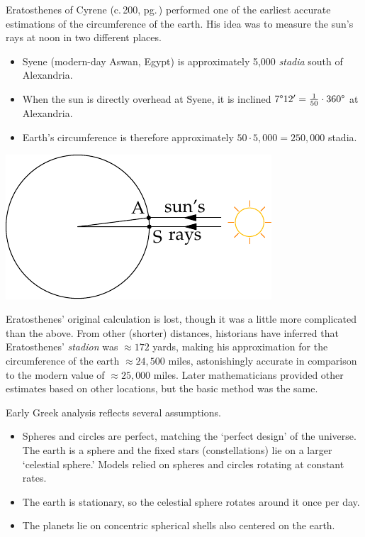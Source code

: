 Eratosthenes of Cyrene (c.\,200\BC, pg.\,\pageref{pg:eratosthenes}) performed one of the earliest accurate estimations of the circumference of the earth. His idea was to measure the sun's rays at noon in two different places.\par
\begin{minipage}[t]{0.6\linewidth}\vspace{-5pt}
	\begin{itemize}\itemsep0pt
	  \item Syene (modern-day Aswan, Egypt) is approximately 5,000 \emph{stadia} south of Alexandria.
		\item When the sun is directly overhead at Syene, it is inclined $\ang 712'=\frac 1{50}\cdot \ang{360}$ at Alexandria.
		\item Earth's circumference is therefore approximately $50\cdot 5,000=250,000$ stadia.
	\end{itemize}
\end{minipage}
\hfill
\begin{minipage}[t]{0.39\linewidth}\vspace{-5pt}
	\flushright\includegraphics[scale=0.95]{geo-18-circearth}
\end{minipage}
\bigbreak

Eratosthenes' original calculation is lost, though it was a little more complicated than the above. From other (shorter) distances, historians have inferred that Eratosthenes' \emph{stadion} was $\approx 172$ yards, making his approximation for the circumference of the earth $\approx 24,500$ miles, astonishingly accurate in comparison to the modern value of $\approx 25,000$ miles. Later mathematicians provided other estimates based on other locations, but the basic method was the same.



Early Greek analysis reflects several assumptions.
\begin{itemize}
  \item Spheres and circles are perfect, matching the `perfect design' of the universe. The earth is a sphere and the fixed stars (constellations) lie on a larger `celestial sphere.' Models relied on spheres and circles rotating at constant rates.
  \item The earth is stationary, so the celestial sphere rotates around it once per day.
  \item The planets lie on concentric spherical shells also centered on the earth.
\end{itemize}

